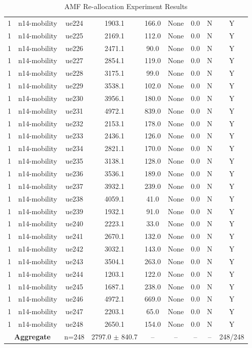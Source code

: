 \begin{table}[ht]
\begin{tabular}{|c|c|c|c|c|c|c|c|c|}
1 & n14-mobility & ue224 & 1903.1 & 166.0 & None & 0.0 & N & Y \\
1 & n14-mobility & ue225 & 2169.1 & 112.0 & None & 0.0 & N & Y \\
1 & n14-mobility & ue226 & 2471.1 & 90.0 & None & 0.0 & N & Y \\
1 & n14-mobility & ue227 & 2854.1 & 119.0 & None & 0.0 & N & Y \\
1 & n14-mobility & ue228 & 3175.1 & 99.0 & None & 0.0 & N & Y \\
1 & n14-mobility & ue229 & 3538.1 & 102.0 & None & 0.0 & N & Y \\
1 & n14-mobility & ue230 & 3956.1 & 180.0 & None & 0.0 & N & Y \\
1 & n14-mobility & ue231 & 4972.1 & 839.0 & None & 0.0 & N & Y \\
1 & n14-mobility & ue232 & 2153.1 & 178.0 & None & 0.0 & N & Y \\
1 & n14-mobility & ue233 & 2436.1 & 126.0 & None & 0.0 & N & Y \\
1 & n14-mobility & ue234 & 2821.1 & 170.0 & None & 0.0 & N & Y \\
1 & n14-mobility & ue235 & 3138.1 & 128.0 & None & 0.0 & N & Y \\
1 & n14-mobility & ue236 & 3536.1 & 189.0 & None & 0.0 & N & Y \\
1 & n14-mobility & ue237 & 3932.1 & 239.0 & None & 0.0 & N & Y \\
1 & n14-mobility & ue238 & 4059.1 & 41.0 & None & 0.0 & N & Y \\
1 & n14-mobility & ue239 & 1932.1 & 91.0 & None & 0.0 & N & Y \\
1 & n14-mobility & ue240 & 2223.1 & 33.0 & None & 0.0 & N & Y \\
1 & n14-mobility & ue241 & 2670.1 & 132.0 & None & 0.0 & N & Y \\
1 & n14-mobility & ue242 & 3032.1 & 143.0 & None & 0.0 & N & Y \\
1 & n14-mobility & ue243 & 3504.1 & 263.0 & None & 0.0 & N & Y \\
1 & n14-mobility & ue244 & 1203.1 & 122.0 & None & 0.0 & N & Y \\
1 & n14-mobility & ue245 & 1687.1 & 238.0 & None & 0.0 & N & Y \\
1 & n14-mobility & ue246 & 4972.1 & 669.0 & None & 0.0 & N & Y \\
1 & n14-mobility & ue247 & 2203.1 & 65.0 & None & 0.0 & N & Y \\
1 & n14-mobility & ue248 & 2650.1 & 154.0 & None & 0.0 & N & Y \\
\multicolumn{2}{|c|}{\textbf{Aggregate}} & n=248 & 2797.0 $\pm$ 840.7 & -- & -- & -- & -- & 248/248 \\
\hline
\end{tabular}
\caption{AMF Re-allocation Experiment Results}
\label{tab:amf_realloc}
\end{table}
